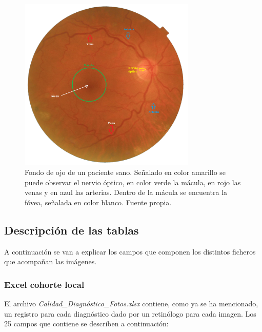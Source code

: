 \begin{figure}[h]
    \centering
    \includegraphics[width=0.75\textwidth]{img/partes_retina.png}
    \caption{Fondo de ojo de un paciente sano. Señalado en color amarillo se puede observar el nervio óptico, en color verde la mácula, en rojo las venas y en azul las arterias. Dentro de la mácula se encuentra la fóvea, señalada en color blanco. Fuente propia.}
    \label{fig:partes_retina}
\end{figure}

\subsection{Descripción de las tablas}

A continuación se van a explicar los campos que componen los distintos ficheros que acompañan las imágenes.

\subsubsection{Excel cohorte local}

El archivo \textit{Calidad\_Diagnóstico\_Fotos.xlsx} contiene, como ya se ha mencionado, un registro para cada diagnóstico dado por un retinólogo para cada imagen. Los 25 campos que contiene se describen a continuación: 

